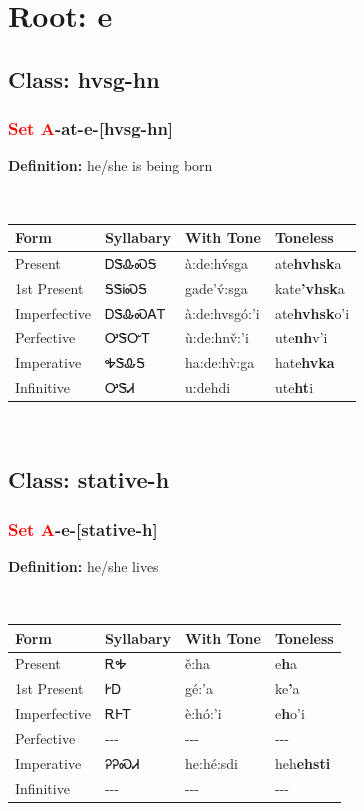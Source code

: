 \needspace{4in}
\section*{Root: e}
\nopagebreak
{}
\needspace{3in}
\subsection*{Class: hvsg-hn}
\nopagebreak
\needspace{2in}
\subsubsection*{\textcolor{Red}{Set A}{-}at{-}\textbf{e}{-}[hvsg-hn]}
\nopagebreak
\textbf{Definition: } he/she is being born
\\[0.5em]
\begin{tabularx}{\textwidth}{l X X X}%
\toprule%
\textbf{Form}&\textbf{Syllabary}&\textbf{With Tone}&\textbf{Toneless}\\%
\midrule%
Present&ᎠᏕᎲᏍᎦ&à:de:hv́sga&ate\textbf{hvhsk}a\\%
1st Present&ᎦᏕᎥᏍᎦ&gade’v́:sga&kate\textbf{'vhsk}a\\%
Imperfective&ᎠᏕᎲᏍᎪᎢ&à:de:hvsgó:’i&ate\textbf{hvhsk}o'i\\%
Perfective&ᎤᏕᏅᎢ&ù:de:hnv̌:’i&ute\textbf{nh}v'i\\%
Imperative&ᎭᏕᎲᎦ&ha:de:hv̀:ga&hate\textbf{hvka}\\%
Infinitive&ᎤᏕᏗ&u:dehdi&ute\textbf{ht}i\\%
\bottomrule%
\end{tabularx}
\\[1em]
\needspace{3in}
\subsection*{Class: stative-h}
\nopagebreak
\needspace{2in}
\subsubsection*{\textcolor{Red}{Set A}{-}\textbf{e}{-}[stative-h]}
\nopagebreak
\textbf{Definition: } he/she lives
\\[0.5em]
\begin{tabularx}{\textwidth}{l X X X}%
\toprule%
\textbf{Form}&\textbf{Syllabary}&\textbf{With Tone}&\textbf{Toneless}\\%
\midrule%
Present&ᎡᎭ&ě:ha&e\textbf{h}a\\%
1st Present&ᎨᎠ&gé:’a&ke\textbf{'}a\\%
Imperfective&ᎡᎰᎢ&è:hó:’i&e\textbf{h}o'i\\%
Perfective&{-}{-}{-}&{-}{-}{-}&{-}{-}{-}\\%
Imperative&ᎮᎮᏍᏗ&he:hé:sdi&heh\textbf{ehsti}\\%
Infinitive&{-}{-}{-}&{-}{-}{-}&{-}{-}{-}\\%
\bottomrule%
\end{tabularx}
\\[1em]